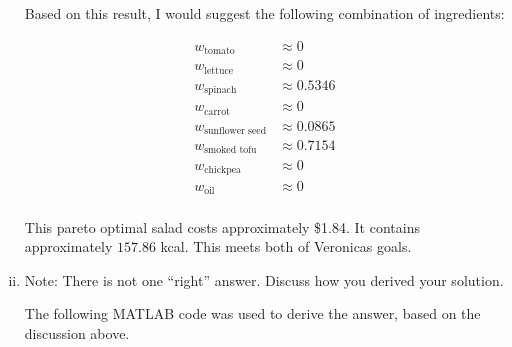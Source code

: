 \documentclass[../main.tex]{subfiles}
\begin{document}
\begin{enumerate}[i.]
	Based on this result, I would suggest the following combination of ingredients:

	\begin{equation*}
		\begin{aligned}
			w_{\text{tomato}} &\approx 0 \\
			w_{\text{lettuce}} &\approx 0 \\
			w_{\text{spinach}} &\approx 0.5346 \\
			w_{\text{carrot}} &\approx 0 \\
			w_{\text{sunflower seed}} &\approx 0.0865 \\
			w_{\text{smoked tofu}} &\approx 0.7154 \\
			w_{\text{chickpea}} &\approx 0 \\
			w_{\text{oil}} &\approx 0 \\
		\end{aligned}
	\end{equation*}

	This pareto optimal salad costs approximately \$1.84. It contains approximately $157.86$ kcal. This meets both of Veronicas goals.

	\item Note: There is not one “right” answer. Discuss how you derived your solution.

	The following MATLAB code was used to derive the answer, based on the discussion above.

	\newpage

	


\end{enumerate}
\end{document}
